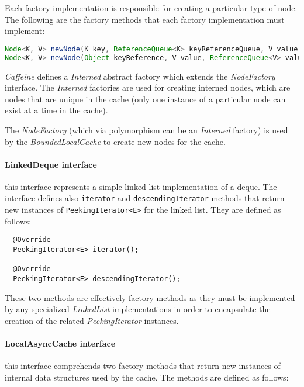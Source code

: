 \noindent Each factory implementation is responsible for creating a particular type of node. The following are the factory methods that each factory implementation must implement:

\begin{lstlisting}[language=Java]
Node<K, V> newNode(K key, ReferenceQueue<K> keyReferenceQueue, V value, ReferenceQueue<V> valueReferenceQueue, int weight, long now);
Node<K, V> newNode(Object keyReference, V value, ReferenceQueue<V> valueReferenceQueue, int weight, long now);
\end{lstlisting}

\noindent \textit{Caffeine} defines a \textit{Interned} abstract factory which extends the \textit{NodeFactory} interface. The \textit{Interned} factories are used for creating interned nodes, which are nodes that are unique in the cache (only one instance of a particular node can exist at a time in the cache).

\noindent The \textit{NodeFactory} (which via polymorphism can be an \textit{Interned} factory) is used by the \textit{BoundedLocalCache} to create new nodes for the cache.

\paragraph{LinkedDeque interface} this interface represents a simple linked list implementation of a deque. The interface defines also \texttt{iterator} and \texttt{descendingIterator} methods that return new instances of \texttt{PeekingIterator<E>} for the linked list. They are defined as follows:

\begin{lstlisting}
  @Override
  PeekingIterator<E> iterator();

  @Override
  PeekingIterator<E> descendingIterator();
\end{lstlisting}

\noindent These two methods are effectively factory methods as they must be implemented by any specialized \textit{LinkedList} implementations in order to encapsulate the creation of the related \textit{PeekingIterator} instances.

\paragraph{LocalAsyncCache interface} this interface comprehends two factory methods that return new instances of internal data structures used by the cache. The methods are defined as follows:

